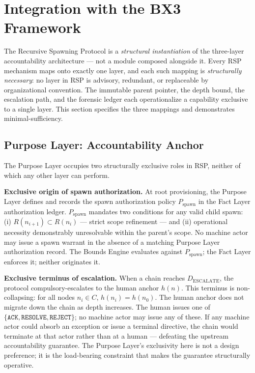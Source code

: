 \section{Integration with the BX3 Framework}
\label{sec:rs-integration}

The Recursive Spawning Protocol is a \textit{structural instantiation} of the \bxthree three-layer accountability architecture — not a module composed alongside it. Every RSP mechanism maps onto exactly one \bxthree layer, and each such mapping is \textit{structurally necessary}: no layer in RSP is advisory, redundant, or replaceable by organizational convention. The immutable parent pointer, the depth bound, the escalation path, and the forensic ledger each operationalize a capability exclusive to a single layer. This section specifies the three mappings and demonstrates minimal-sufficiency.

\subsection{Purpose Layer: Accountability Anchor}
\label{sec:rs-purpose-anchor}

The Purpose Layer occupies two structurally exclusive roles in RSP, neither of which any other layer can perform.

\medskip
\noindent\textbf{Exclusive origin of spawn authorization.} At root provisioning, the Purpose Layer defines and records the spawn authorization policy $P_{\mathrm{spawn}}$ in the Fact Layer authorization ledger. $P_{\mathrm{spawn}}$ mandates two conditions for any valid child spawn: (i) $R(n_{i+1}) \subset R(n_i)$ — strict scope refinement — and (ii) operational necessity demonstrably unresolvable within the parent's scope. No machine actor may issue a spawn warrant in the absence of a matching Purpose Layer authorization record. The Bounds Engine evaluates against $P_{\mathrm{spawn}}$; the Fact Layer enforces it; neither originates it.

\medskip
\noindent\textbf{Exclusive terminus of escalation.} When a chain reaches $D_{\mathrm{ESCALATE}}$, the protocol compulsory-escalates to the human anchor $h(n)$. This terminus is non-collapsing: for all nodes $n_i \in C$, $h(n_i) = h(n_0)$. The human anchor does not migrate down the chain as depth increases. The human issues one of $\{\texttt{ACK}, \texttt{RESOLVE}, \texttt{REJECT}\}$; no machine actor may issue any of these. If any machine actor could absorb an exception or issue a terminal directive, the chain would terminate at that actor rather than at a human — defeating the upstream \bxthree accountability guarantee. The Purpose Layer's exclusivity here is not a design preference; it is the load-bearing constraint that makes the guarantee structurally operative.

